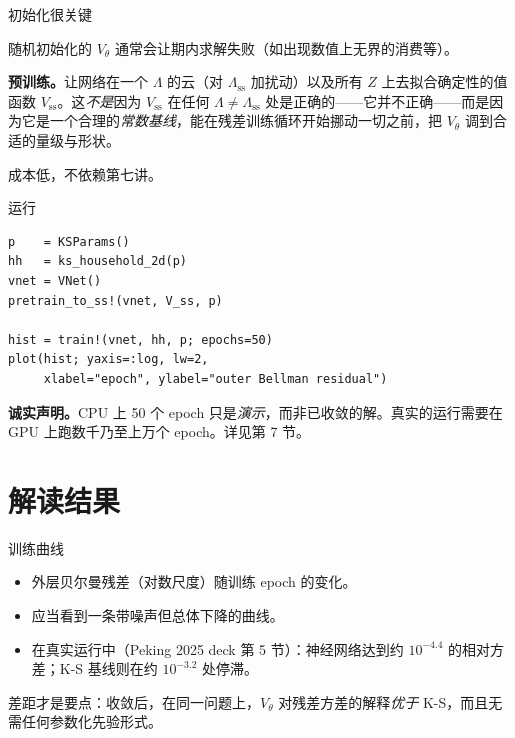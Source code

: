 \documentclass[10pt,aspectratio=169]{beamer}
\begin{document}
\begin{frame}{初始化很关键}

随机初始化的 $V_\theta$ 通常会让期内求解失败（如出现数值上无界的消费等）。

\smallskip

\textbf{预训练。}让网络在一个 $\Lambda$ 的云（对 $\Lambda_{\mathrm{ss}}$ 加扰动）以及所有 $Z$ 上去拟合确定性的值函数 $V_{\mathrm{ss}}$。这\emph{不是}因为 $V_{\mathrm{ss}}$ 在任何 $\Lambda \neq \Lambda_{\mathrm{ss}}$ 处是正确的——它并不正确——而是因为它是一个合理的\emph{常数基线}，能在残差训练循环开始挪动一切之前，把 $V_\theta$ 调到合适的量级与形状。

\smallskip

成本低，不依赖第七讲。

\end{frame}

\begin{frame}[fragile]{运行}
\begin{lstlisting}
p    = KSParams()
hh   = ks_household_2d(p)
vnet = VNet()
pretrain_to_ss!(vnet, V_ss, p)

hist = train!(vnet, hh, p; epochs=50)
plot(hist; yaxis=:log, lw=2,
     xlabel="epoch", ylabel="outer Bellman residual")
\end{lstlisting}

\vspace{0.4em}

\textbf{诚实声明。}CPU 上 50 个 epoch 只是\emph{演示}，而非已收敛的解。真实的运行需要在 GPU 上跑数千乃至上万个 epoch。详见第 7 节。

\end{frame}

\section[解读结果]{解读结果}

\begin{frame}{训练曲线}

\begin{itemize}
  \item 外层贝尔曼残差（对数尺度）随训练 epoch 的变化。
  \item 应当看到一条带噪声但总体下降的曲线。
  \item 在真实运行中（Peking 2025 deck 第 5 节）：神经网络达到约 $10^{-4.4}$ 的相对方差；K-S 基线则在约 $10^{-3.2}$ 处停滞。
\end{itemize}

\smallskip

差距才是要点：收敛后，在同一问题上，$V_\theta$ 对残差方差的解释\emph{优于} K-S，而且无需任何参数化先验形式。

\end{frame}
\end{document}
